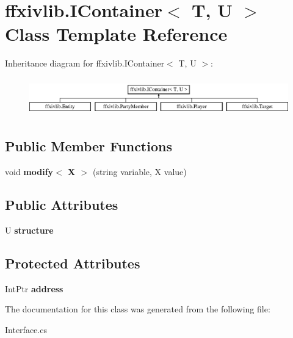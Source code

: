\hypertarget{classffxivlib_1_1_i_container_3_01_t_00_01_u_01_4}{\section{ffxivlib.\-I\-Container$<$ T, U $>$ Class Template Reference}
\label{classffxivlib_1_1_i_container_3_01_t_00_01_u_01_4}
}
Inheritance diagram for ffxivlib.\-I\-Container$<$ T, U $>$\-:\begin{figure}[H]
\begin{center}
\leavevmode
\includegraphics[height=1.676647cm]{classffxivlib_1_1_i_container_3_01_t_00_01_u_01_4}
\end{center}
\end{figure}
\subsection*{Public Member Functions}
\begin{DoxyCompactItemize}
\item 
\hypertarget{classffxivlib_1_1_i_container_3_01_t_00_01_u_01_4_aeecd4e8cfa5cf178b823201e065e129c}{void {\bfseries modify$<$ X $>$} (string variable, X value)}\label{classffxivlib_1_1_i_container_3_01_t_00_01_u_01_4_aeecd4e8cfa5cf178b823201e065e129c}

\end{DoxyCompactItemize}
\subsection*{Public Attributes}
\begin{DoxyCompactItemize}
\item 
\hypertarget{classffxivlib_1_1_i_container_3_01_t_00_01_u_01_4_a4a077a13df5c84a292c1c03e05bc9ac7}{U {\bfseries structure}}\label{classffxivlib_1_1_i_container_3_01_t_00_01_u_01_4_a4a077a13df5c84a292c1c03e05bc9ac7}

\end{DoxyCompactItemize}
\subsection*{Protected Attributes}
\begin{DoxyCompactItemize}
\item 
\hypertarget{classffxivlib_1_1_i_container_3_01_t_00_01_u_01_4_a4c25b42d6bd8f3114947d137bea657c1}{Int\-Ptr {\bfseries address}}\label{classffxivlib_1_1_i_container_3_01_t_00_01_u_01_4_a4c25b42d6bd8f3114947d137bea657c1}

\end{DoxyCompactItemize}


The documentation for this class was generated from the following file\-:\begin{DoxyCompactItemize}
\item 
Interface.\-cs\end{DoxyCompactItemize}
